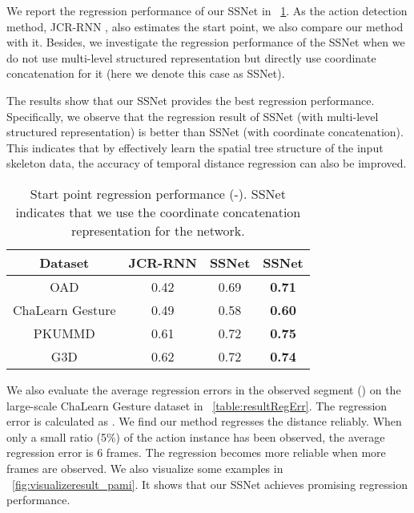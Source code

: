 \documentclass[10pt,twocolumn,letterpaper]{article}
\begin{document}
We report the regression performance of our SSNet in \tablename{~\ref{table:resultSLScore}}.
As the action detection method, JCR-RNN \cite{li2016online}, also estimates the start point, we also compare our method with it.
Besides, we investigate the regression performance of the SSNet when we do not use multi-level structured representation but directly use coordinate concatenation for it
(here we denote this case as SSNet).

The results show that our SSNet provides the best regression performance.
Specifically, we observe that the regression result of SSNet (with multi-level structured representation) is better than SSNet (with coordinate concatenation).
This indicates that by effectively learn the spatial tree structure of the input skeleton data,
the accuracy of temporal distance regression can also be improved.




\begin{table}[tbp]
	\caption{Start point regression performance (-).
SSNet indicates that we use the coordinate concatenation representation for the network.}
	\label{table:resultSLScore}
	\centering
	\small
	\begin{tabular}{cccc}
		\toprule
Dataset              & JCR-RNN  &  SSNet   &      SSNet    \\
		\midrule
		OAD                  &  0.42    &   0.69    &   \textbf{0.71}     \\
        ChaLearn Gesture     &  0.49    &   0.58    &   \textbf{0.60}     \\
        PKUMMD               &  0.61    &   0.72    &   \textbf{0.75}      \\
		G3D                  &  0.62    &   0.72    &   \textbf{0.74}         \\
		\bottomrule
	\end{tabular}
\end{table}

We also evaluate the average regression errors in the observed segment () on the large-scale ChaLearn Gesture dataset in \tablename{~\ref{table:resultRegErr}}. The regression error is calculated as .
We find our method regresses the distance reliably.
When only a small ratio (5\%) of the action instance has been observed, the average regression error is 6 frames.  The regression becomes more reliable when more frames are observed.
We also visualize some examples in \figurename{~\ref{fig:visualizeresult_pami}}.
It shows that our SSNet achieves promising regression performance.
\end{document}

